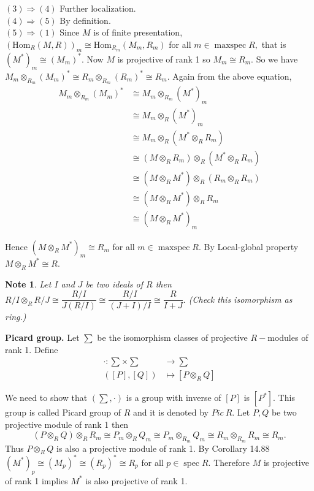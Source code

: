 \documentclass[11pt]{amsart}
\newtheorem{note}[theorem]{Note}
\newcommand{\Hom}[1]{\text{Hom}_R\left(#1\right)}
\DeclareMathOperator{\spec}{\text{spec}}
\DeclareMathOperator{\mspec}{\text{maxspec}}
\begin{document}
$(3)\Rightarrow (4)$ Further localization.\\

$(4)\Rightarrow (5)$ By definition.\\

$(5)\Rightarrow (1)$ Since $M$ is of finite presentation, $(\Hom{M,R})_m\cong \text{Hom}_{R_m}(M_m,R_m)$ for all $m\in\mspec R,$ that is $(M^*)_m\cong (M_m)^*.$ Now $M$ is projective of rank 1 so $M_m\cong R_m.$ So we have $M_m\otimes_{R_m} (M_m)^*\cong R_m\otimes_{R_m} (R_m)^*\cong R_m.$ Again from the above equation, \begin{align*}
M_m\otimes_{R_m} (M_m)^* &\cong M_m\otimes_{R_m} (M^*)_m\\
&\cong M_m \otimes_R (M^*)_m\\
&\cong M_m\otimes_R (M^*\otimes_R R_m)\\
&\cong (M\otimes_R R_m)\otimes_R (M^*\otimes_R R_m)\\
&\cong (M\otimes_R M^*)\otimes_R (R_m\otimes_R R_m)\\
&\cong (M\otimes_R M^*)\otimes_R R_m\\
&\cong (M\otimes_R M^*)_m
\end{align*}
  
Hence $(M\otimes_R M^*)_m\cong R_m$ for all $m\in \mspec R.$ By Local-global property $M\otimes_R M^*\cong R.$

\begin{note}

Let $I$ and $J$ be two ideals of $R$ then  $R/I\otimes_R R/J\cong \dfrac{R/I}{J(R/I)}\cong \dfrac{R/I}{(J+I)/I}\cong \dfrac{R}{I+J}.$ (Check this isomorphism as ring.)

\end{note}


\textbf{Picard group.} Let $\sum$ be the isomorphism classes of projective $R-$modules of rank 1. Define \begin{align*}
\cdot:\sum\times\sum&\to \sum\\
([P],[Q])&\mapsto [P\otimes_R Q]
\end{align*}

We need to show that $\left(\sum,\cdot\right)$ is a group with inverse of $[P]$ is $[P^*].$ This group is called Picard group of $R$ and it is denoted by $Pic~R.$ Let $P,Q$ be two projective module of rank 1 then $$(P\otimes_R Q)\otimes_R R_m\cong P_m\otimes_R Q_m\cong P_m\otimes_{R_m} Q_m\cong R_m\otimes_{R_m} R_m\cong R_m.$$ Thus $P\otimes_R Q$ is also a projective module of rank 1. By Corollary 14.88 $(M^*)_p\cong (M_p)^*\cong (R_p)^*\cong R_p$ for all $p\in\spec R.$ Therefore $M$ is projective of rank 1 implies $M^*$ is also projective of rank 1.\\
\end{document}
